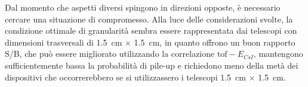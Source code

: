 Dal momento che aspetti diversi spingono in direzioni opposte, è necessario cercare una situazione di compromesso.
Alla luce delle considerazioni svolte, la condizione ottimale di granularità sembra essere rappresentata dai telescopi con dimensioni trasversali di 1.5~cm $\times$ 1.5~cm, in quanto offrono un buon rapporto S/B, che può essere migliorato utilizzando la correlazione $\mbox{tof} - E_{CsI}$, mantengono sufficientemente bassa la probabilità di pile-up e richiedono meno della metà dei dispositivi che occorrerebbero se si utilizzassero i telescopi 1.5~cm $\times$ 1.5~cm.











